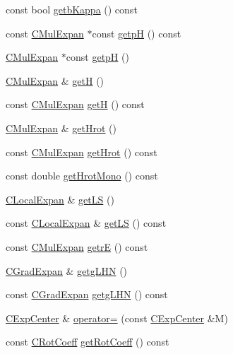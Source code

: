 \begin{DoxyCompactItemize}
\item 
const bool \hyperlink{classCExpCenter_aac86d77bd8353ccf10bb6b8f229575c7}{getb\-Kappa} () const 
\item 
const \hyperlink{classCMulExpan}{C\-Mul\-Expan} $\ast$const \hyperlink{classCExpCenter_a6f8eb6dfa6331e8d75a04ec7998a603c}{getp\-H} () const 
\item 
\hyperlink{classCMulExpan}{C\-Mul\-Expan} $\ast$const \hyperlink{classCExpCenter_a6a9a76aa4ddcbb79a4cee534f7c48d07}{getp\-H} ()
\item 
\hyperlink{classCMulExpan}{C\-Mul\-Expan} \& \hyperlink{classCExpCenter_a2051390bfbef8a9fd1e045cab42b99ba}{get\-H} ()
\item 
const \hyperlink{classCMulExpan}{C\-Mul\-Expan} \hyperlink{classCExpCenter_ad4efe45a4f948726fcfcecb975d5044d}{get\-H} () const 
\item 
\hyperlink{classCMulExpan}{C\-Mul\-Expan} \& \hyperlink{classCExpCenter_aff64017f498b93ed212c674865f95f40}{get\-Hrot} ()
\item 
const \hyperlink{classCMulExpan}{C\-Mul\-Expan} \hyperlink{classCExpCenter_aff23edad5050d0e1b80e72a90d1fbb7a}{get\-Hrot} () const 
\item 
const double \hyperlink{classCExpCenter_a1206c32b0699ae5eef35dd1f88cf9816}{get\-Hrot\-Mono} () const 
\item 
\hyperlink{classCLocalExpan}{C\-Local\-Expan} \& \hyperlink{classCExpCenter_aba7d7d3c0f0b49e28d66f96621be677e}{get\-L\-S} ()
\item 
const \hyperlink{classCLocalExpan}{C\-Local\-Expan} \& \hyperlink{classCExpCenter_a7269ed18262fdfff4d066fbe8521b928}{get\-L\-S} () const 
\item 
const \hyperlink{classCMulExpan}{C\-Mul\-Expan} \hyperlink{classCExpCenter_a1e57fde5e2b0b605633dd57a083347bd}{getr\-E} () const 
\item 
\hyperlink{classCGradExpan}{C\-Grad\-Expan} \& \hyperlink{classCExpCenter_a070d0724a38ffb86095a95eacb55aac1}{getg\-L\-H\-N} ()
\item 
const \hyperlink{classCGradExpan}{C\-Grad\-Expan} \hyperlink{classCExpCenter_a94e7b22b07e8224827c489e84d26e155}{getg\-L\-H\-N} () const 
\item 
\hyperlink{classCExpCenter}{C\-Exp\-Center} \& \hyperlink{classCExpCenter_a169ca7822910b6a9906b1d6050278af8}{operator=} (const \hyperlink{classCExpCenter}{C\-Exp\-Center} \&M)
\item 
const \hyperlink{classCRotCoeff}{C\-Rot\-Coeff} \hyperlink{classCExpCenter_a74d5d90cdcf9b6a61540b607b0269a23}{get\-Rot\-Coeff} () const 
\end{DoxyCompactItemize}
